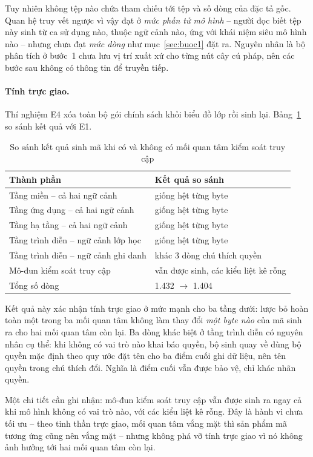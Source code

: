 Tuy nhiên không tệp nào chứa tham chiếu tới tệp và số dòng của đặc tả gốc. Quan hệ truy vết ngược vì vậy đạt ở \emph{mức phần tử mô hình} -- người đọc biết tệp này sinh từ ca sử dụng nào, thuộc ngữ cảnh nào, ứng với khái niệm siêu mô hình nào -- nhưng chưa đạt \emph{mức dòng} như mục~\ref{sec:buoc1} đặt ra. Nguyên nhân là bộ phân tích ở bước~1 chưa lưu vị trí xuất xứ cho từng nút cây cú pháp, nên các bước sau không có thông tin để truyền tiếp.

\paragraph{Tính trực giao.}
Thí nghiệm E4 xóa toàn bộ gói chính sách khỏi biểu đồ lớp rồi sinh lại. Bảng~\ref{tab:truc-giao} so sánh kết quả với E1.

\begin{table}[htbp]
\centering
\caption{So sánh kết quả sinh mã khi có và không có mối quan tâm kiểm soát truy cập}
\label{tab:truc-giao}
\small
\begin{tabularx}{\textwidth}{@{}Xl@{}}
\toprule
\textbf{Thành phần} & \textbf{Kết quả so sánh} \\
\midrule
Tầng miền -- cả hai ngữ cảnh & giống hệt từng byte \\
Tầng ứng dụng -- cả hai ngữ cảnh & giống hệt từng byte \\
Tầng hạ tầng -- cả hai ngữ cảnh & giống hệt từng byte \\
Tầng trình diễn -- ngữ cảnh lớp học & giống hệt từng byte \\
Tầng trình diễn -- ngữ cảnh ghi danh & khác 3 dòng chú thích quyền \\
Mô-đun kiểm soát truy cập & vẫn được sinh, các kiểu liệt kê rỗng \\
\midrule
Tổng số dòng & 1.432 $\to$ 1.404 \\
\bottomrule
\end{tabularx}
\end{table}

Kết quả này xác nhận tính trực giao ở mức mạnh cho ba tầng dưới: lược bỏ hoàn toàn một trong ba mối quan tâm không làm thay đổi \emph{một byte nào} của mã sinh ra cho hai mối quan tâm còn lại. Ba dòng khác biệt ở tầng trình diễn có nguyên nhân cụ thể: khi không có vai trò nào khai báo quyền, bộ sinh quay về dùng bộ quyền mặc định theo quy ước đặt tên cho ba điểm cuối ghi dữ liệu, nên tên quyền trong chú thích đổi. Nghĩa là điểm cuối vẫn được bảo vệ, chỉ khác nhãn quyền.

Một chi tiết cần ghi nhận: mô-đun kiểm soát truy cập vẫn được sinh ra ngay cả khi mô hình không có vai trò nào, với các kiểu liệt kê rỗng. Đây là hành vi chưa tối ưu -- theo tinh thần trực giao, mối quan tâm vắng mặt thì sản phẩm mã tương ứng cũng nên vắng mặt -- nhưng không phá vỡ tính trực giao vì nó không ảnh hưởng tới hai mối quan tâm còn lại.

